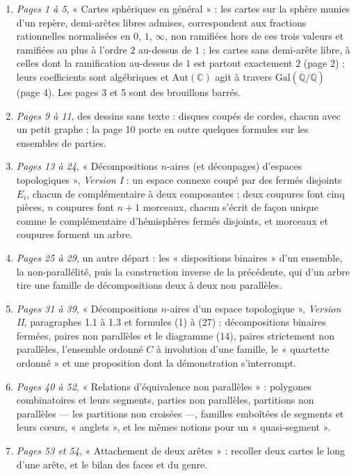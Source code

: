 \documentclass[11pt,a4paper]{article}
\begin{document}
\begin{enumerate}
  \item \emph{Pages 1 à 5}, « Cartes sphériques en général » : les cartes
  sur la sphère munies d'un repère, demi-arêtes libres admises,
  correspondent aux fractions rationnelles normalisées en $0$, $1$,
  $\infty$, non ramifiées hors de ces trois valeurs et ramifiées au plus à
  l'ordre $2$ au-dessus de $1$ ; les cartes sans demi-arête libre, à celles
  dont la ramification au-dessus de $1$ est partout exactement $2$ (page 2) ; leurs
  coefficients sont algébriques et $\mathrm{Aut}(\mathbb{C})$ agit à travers
  $\mathrm{Gal}(\overline{\mathbb{Q}}/\mathbb{Q})$ (page 4). Les pages 3 et 5
  sont des brouillons barrés.
  \item \emph{Pages 9 à 11}, des dessins sans texte : disques coupés de
  cordes, chacun avec un petit graphe ; la page 10 porte en outre quelques
  formules sur les ensembles de parties.
  \item \emph{Pages 13 à 24}, « Décompositions $n$-aires (et découpages)
  d'espaces topologiques », \emph{Version I} : un espace connexe coupé par
  des fermés disjoints $E_i$, chacun de complémentaire à deux composantes ;
  deux coupures font cinq pièces, $n$ coupures font $n+1$ morceaux, chacun
  s'écrit de façon unique comme le complémentaire d'hémisphères fermés
  disjoints, et morceaux et coupures forment un arbre.
  \item \emph{Pages 25 à 29}, un autre départ : les « dispositions
  binaires » d'un ensemble, la non-parallélité, puis la construction
  inverse de la précédente, qui d'un arbre tire une famille de
  décompositions deux à deux non parallèles.
  \item \emph{Pages 31 à 39}, « Décompositions $n$-aires d'un espace
  topologique », \emph{Version II}, paragraphes 1.1 à 1.3 et formules (1) à
  (27) : décompositions binaires fermées, paires non parallèles et le
  diagramme (14), paires strictement non parallèles, l'ensemble ordonné $C$
  à involution d'une famille, le « quartette ordonné » et une proposition
  dont la démonstration s'interrompt.
  \item \emph{Pages 40 à 52}, « Relations d'équivalence non parallèles » :
  polygones combinatoires et leurs segments, parties non parallèles,
  partitions non parallèles --- les partitions non croisées ---, familles
  emboîtées de segments et leurs cœurs, « anglets », et les mêmes notions
  pour un « quasi-segment ».
  \item \emph{Pages 53 et 54}, « Attachement de deux arêtes » : recoller deux
  cartes le long d'une arête, et le bilan des faces et du genre.
\end{enumerate}
\end{document}
